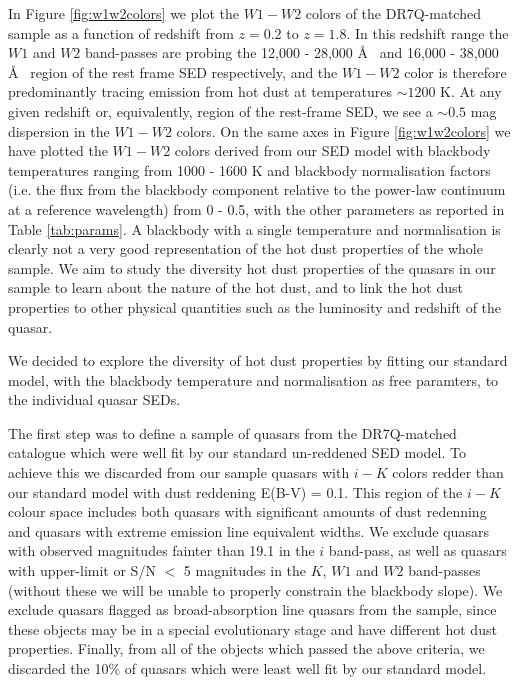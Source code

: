 In Figure \ref{fig:w1w2colors} we plot the $W1 - W2$ colors of the DR7Q-matched sample as a function of redshift from $z=0.2$ to $z=1.8$. In this redshift range the $W1$ and $W2$ band-passes are probing the 12,000 - 28,000 \AA~ and 16,000 - 38,000 \AA~ region of the rest frame SED respectively, and the $W1-W2$ color is therefore predominantly tracing emission from hot dust at temperatures $\sim 1200$ K. At any given redshift or, equivalently, region of the rest-frame SED, we see a $\sim 0.5$ mag dispersion in the $W1-W2$ colors. On the same axes in Figure \ref{fig:w1w2colors} we have plotted the $W1 - W2$ colors derived from our SED model with blackbody temperatures ranging from 1000 - 1600 K and blackbody normalisation factors (i.e. the flux from the blackbody component relative to the power-law continuum at a reference wavelength) from 0 - 0.5, with the other parameters as reported in Table \ref{tab:params}. A blackbody with a single temperature and normalisation is clearly not a very good representation of the hot dust properties of the whole sample. We aim to study the diversity hot dust properties of the quasars in our sample to learn about the nature of the hot dust, and to link the hot dust properties to other physical quantities such as the luminosity and redshift of the quasar. 

We decided to explore the diversity of hot dust properties by fitting our standard model, with the blackbody temperature and normalisation as free paramters, to the individual quasar SEDs. 

The first step was to define a sample of quasars from the DR7Q-matched catalogue which were well fit by our standard un-reddened SED model. To achieve this we discarded from our sample quasars with $i - K$ colors redder than our standard model with dust reddening E(B-V) = 0.1. This region of the $i-K$ colour space includes both quasars with significant amounts of dust redenning and quasars with extreme emission line equivalent widths. We exclude quasars with observed magnitudes fainter than 19.1 in the $i$ band-pass, as well as quasars with upper-limit or S/N $<$ 5 magnitudes in the $K$, $W1$ and $W2$ band-passes (without these we will be unable to properly constrain the blackbody slope). We exclude quasars flagged as broad-absorption line quasars \citep[BALQSOs;][]{weymann91} from the sample, since these objects may be in a special evolutionary stage and have different hot dust properties. Finally, from all of the objects which passed the above criteria, we discarded the 10\% of quasars which were least well fit by our standard model.   

